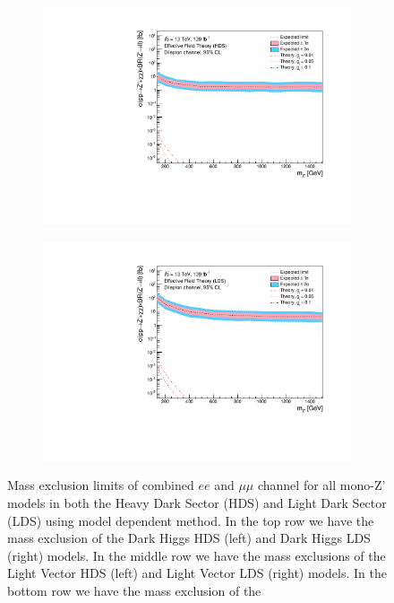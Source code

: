 \documentclass[12pt, a4paper]{book}
\begin{document}
\begin{figure}[!ht]
\begin{subfigure}[b]{0.49\textwidth}
      \includegraphics[width=1\textwidth]{Limits/EFT_HDS/mass_exclusion_comb.pdf}
   \end{subfigure}
   \hfill
   \begin{subfigure}[b]{0.49\textwidth}
      \centering
      \includegraphics[width=1\textwidth]{Limits/EFT_LDS/mass_exclusion_comb.pdf}
   \end{subfigure}
   \caption[Mass exclusion limits of combined $ee$ and $\mu\mu$ channel for all mono-Z' models using model dependent method]{Mass exclusion limits of combined $ee$ and $\mu\mu$ channel for all mono-Z' models in both the Heavy Dark Sector (HDS) and Light Dark Sector (LDS) using model dependent method. 
   In the top row we have the mass exclusion of the Dark Higgs HDS (left) and Dark Higgs LDS (right) models. In the middle row we have the mass exclusions of the Light Vector HDS (left) and Light Vector LDS (right) models. In the bottom row we have the mass exclusion of the 
}
\end{figure}
\end{document}
